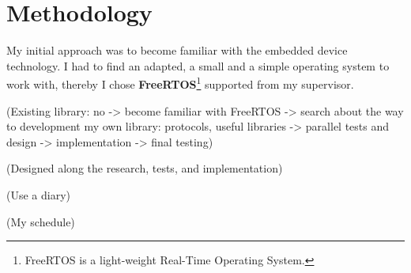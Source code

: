 \chapter{Methodology}

\hspace{15mm}My initial approach was to become familiar with the embedded device technology. I had to find an adapted, a small and a simple operating system to work with, thereby I chose \textbf{FreeRTOS}\footnote{FreeRTOS is a light-weight Real-Time Operating System.} supported from my supervisor.

(Existing library: no -> become familiar with FreeRTOS -> search about the way to development my own library: protocols, useful libraries -> parallel tests and design -> implementation -> final testing)

(Designed along the research, tests, and implementation)

(Use a diary)

(My schedule)

\clearpage

